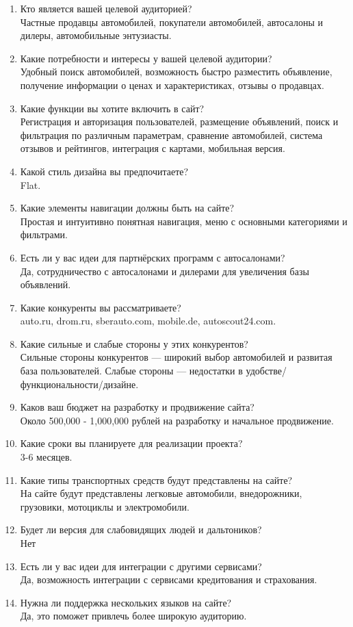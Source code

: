 \begin{enumerate}
    \item Кто является вашей целевой аудиторией?\\
        Частные продавцы автомобилей, покупатели автомобилей, автосалоны и дилеры, автомобильные энтузиасты.
    \item Какие потребности и интересы у вашей целевой аудитории?\\
        Удобный поиск автомобилей, возможность быстро разместить объявление, получение информации о ценах и характеристиках, отзывы о продавцах.
    \item Какие функции вы хотите включить в сайт?\\
        Регистрация и авторизация пользователей, размещение объявлений, поиск и фильтрация по различным параметрам, сравнение автомобилей, система отзывов и рейтингов, интеграция с картами, мобильная версия.
    \item Какой стиль дизайна вы предпочитаете?\\
        Flat.
    \item Какие элементы навигации должны быть на сайте?\\
        Простая и интуитивно понятная навигация, меню с основными категориями и фильтрами.
    \item Есть ли у вас идеи для партнёрских программ с автосалонами?\\
        Да, сотрудничество с автосалонами и дилерами для увеличения базы объявлений.
    \item Какие конкуренты вы рассматриваете?\\
        auto.ru, drom.ru, sberauto.com, mobile.de, autoscout24.com.
    \item Какие сильные и слабые стороны у этих конкурентов?\\
        Сильные стороны конкурентов — широкий выбор автомобилей и развитая база пользователей. Слабые стороны — недостатки в удобстве/функциональности/дизайне.
    \item Каков ваш бюджет на разработку и продвижение сайта?\\
        Около 500,000 - 1,000,000 рублей на разработку и начальное продвижение.
    \item Какие сроки вы планируете для реализации проекта?\\
        3-6 месяцев.
    \item Какие типы транспортных средств будут представлены на сайте?\\
         На сайте будут представлены легковые автомобили, внедорожники, грузовики, мотоциклы и электромобили.
    \item Будет ли версия для слабовидящих людей и дальтоников?\\
        Нет
    \item Есть ли у вас идеи для интеграции с другими сервисами?\\
        Да, возможность интеграции с сервисами кредитования и страхования.
    \item Нужна ли поддержка нескольких языков на сайте?\\
        Да, это поможет привлечь более широкую аудиторию.
\end{enumerate}
\bigskip

